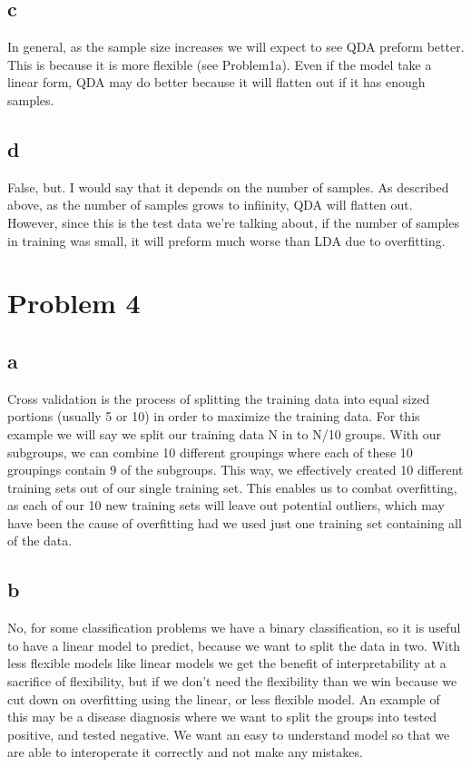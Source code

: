 \documentclass{article}
\begin{document}
\subsection*{c}
In general, as the sample size increases we will expect to see QDA preform better. This is because it is more flexible (see Problem1a). Even if the model take a linear form, QDA may do better because it will flatten out if it has enough samples.\\

\subsection*{d}
False, but. I would say that it depends on the number of samples. As described above, as the number of samples grows to infiinity, QDA will flatten out. However, since this is the test data we're talking about, if the number of samples in training was small, it will preform much worse than LDA due to overfitting.\\

\section*{Problem 4}
\subsection*{a}
Cross validation is the process of splitting the training data into equal sized portions (usually 5 or 10) in order to maximize the training data. For this example we will say we split our training data N in to N/10 groups. With our subgroups, we can combine 10 different groupings where each of these 10 groupings contain 9 of the subgroups. This way, we effectively created 10 different training sets out of our single training set. This enables us to combat overfitting, as each of our 10 new training sets will leave out potential outliers, which may have been the cause of overfitting had we used just one training set containing all of the data.\\
\subsection*{b}
No, for some classification problems we have a binary classification, so it is useful to have a linear model to predict, because we want to split the data in two. With less flexible models like linear models we get the benefit of interpretability at a sacrifice of flexibility, but if we don't need the flexibility than we win because we cut down on overfitting using the linear, or less flexible model. An example of this may be a disease diagnosis where we want to split the groups into tested positive, and tested negative. We want an easy to understand model so that we are able to interoperate it correctly and not make any mistakes. 
\end{document}
